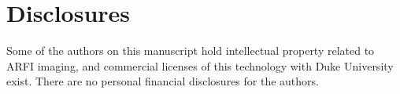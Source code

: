 \section*{Disclosures}
Some of the authors on this manuscript hold intellectual property related to
ARFI imaging, and commercial licenses of this technology with Duke University
exist.  There are no personal financial disclosures for the authors.
